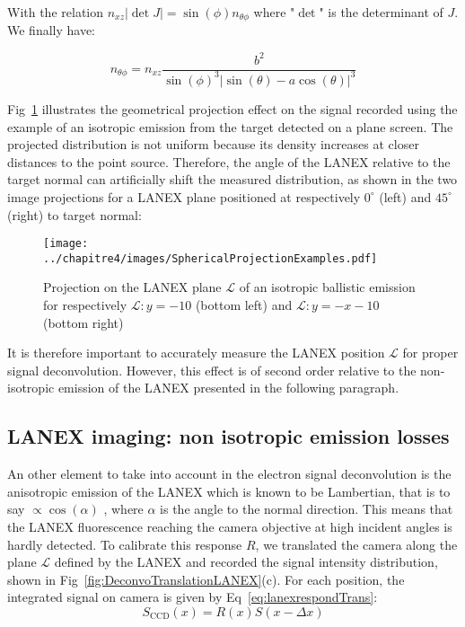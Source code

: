 \noindent With the relation $n_{xz}|\det{J}| = \sin(\phi)n_{\theta\phi}$ where "$\det$" is the determinant of $J$. We finally have:


\begin{equation}
\label{eq:ChangeNrelation}
n_{\theta\phi} = n_{xz}\frac{b^2}{\sin(\phi)^3|\sin(\theta)-a\cos(\theta)|^3}
\end{equation}

\noindent Fig~\ref{fig:LanexProjections} illustrates the geometrical projection effect on the signal recorded using the example of an isotropic emission from the target detected on a plane screen. The projected distribution is not uniform because its density increases at closer distances to the point source. Therefore, the angle of the LANEX relative to the target normal can artificially shift the measured distribution, as shown in the two image projections for a LANEX plane positioned at respectively $0^{\circ}$ (left) and $45^{\circ}$ (right) to target normal:




\begin{figure}[H]
\centering
\texttt{[image: ../chapitre4/images/SphericalProjectionExamples.pdf]}\\
\caption{\label{fig:LanexProjections} Projection on the LANEX plane $\mathcal{L}$ of an isotropic ballistic emission for respectively $\mathcal{L}: y = -10$ (bottom left) and $\mathcal{L}: y = - x -10$ (bottom right) }
\end{figure}

\noindent It is therefore important to accurately measure the LANEX position $\mathcal{L}$ for proper signal deconvolution. However, this effect is of second order relative to the non-isotropic emission of the LANEX presented in the following paragraph.




\subsection{LANEX imaging: non isotropic emission losses}

An other element to take into account in the electron signal deconvolution is the anisotropic emission of the LANEX which is known to be Lambertian, that is to say $\propto \cos(\alpha)$ \cite{glinec2006absolute}, where $\alpha$ is the angle to the normal direction. This means that the LANEX fluorescence reaching the camera objective at high incident angles is hardly detected. To calibrate this response $R$, we translated the camera along the plane  $\mathcal{L}$ defined by the LANEX and recorded the signal intensity distribution, shown in Fig~\ref{fig:DeconvoTranslationLANEX}(c). For each position, the integrated signal on camera is given by Eq~\ref{eq:lanexrespondTrans}:
\begin{equation}
\label{eq:lanexrespondTrans}
S_{\text{CCD}}(x) = R(x)S(x-\Delta x)
\end{equation}


